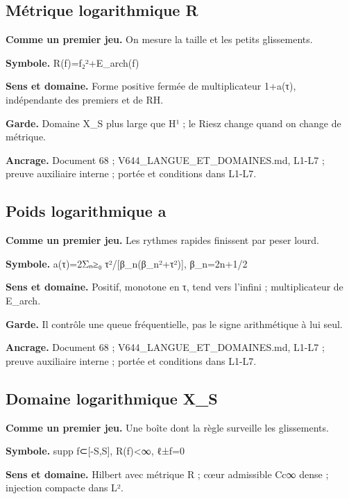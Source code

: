 \documentclass[
  9pt,
  a4paper,
]{article}
\begin{document}
\hypertarget{muxe9trique-logarithmique-r}{%
\subsection{Métrique logarithmique
R}\label{muxe9trique-logarithmique-r}}

\textbf{Comme un premier jeu.} On mesure la taille et les petits
glissements.

\textbf{Symbole.} R(f)=\textbar\textbar f\textbar\textbar₂²+E\_arch(f)

\textbf{Sens et domaine.} Forme positive fermée de multiplicateur
1+a(τ), indépendante des premiers et de RH.

\textbf{Garde.} Domaine X\_S plus large que H¹ ; le Riesz change quand
on change de métrique.

\textbf{Ancrage.} Document 68 ; V644\_LANGUE\_ET\_DOMAINES.md, L1-L7 ;
preuve auxiliaire interne ; portée et conditions dans L1-L7.

\hypertarget{poids-logarithmique-a}{%
\subsection{Poids logarithmique a}\label{poids-logarithmique-a}}

\textbf{Comme un premier jeu.} Les rythmes rapides finissent par peser
lourd.

\textbf{Symbole.} a(τ)=2Σₙ≥₀ τ²/{[}β\_n(β\_n²+τ²){]}, β\_n=2n+1/2

\textbf{Sens et domaine.} Positif, monotone en \textbar τ\textbar, tend
vers l'infini ; multiplicateur de E\_arch.

\textbf{Garde.} Il contrôle une queue fréquentielle, pas le signe
arithmétique à lui seul.

\textbf{Ancrage.} Document 68 ; V644\_LANGUE\_ET\_DOMAINES.md, L1-L7 ;
preuve auxiliaire interne ; portée et conditions dans L1-L7.

\hypertarget{domaine-logarithmique-x_s}{%
\subsection{Domaine logarithmique
X\_S}\label{domaine-logarithmique-x_s}}

\textbf{Comme un premier jeu.} Une boîte dont la règle surveille les
glissements.

\textbf{Symbole.} supp f⊂{[}-S,S{]}, R(f)\textless∞, ℓ±f=0

\textbf{Sens et domaine.} Hilbert avec métrique R ; cœur admissible Cc∞
dense ; injection compacte dans L².
\end{document}
